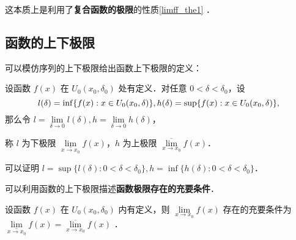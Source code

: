 这本质上是利用了\textbf{复合函数的极限}的性质\autoref{limff_the1} ．

\subsection{函数的上下极限}
可以模仿序列的上下极限给出函数上下极限的定义：

设函数 $f(x)$ 在 $U_0(x_0,\delta_0)$ 处有定义．对任意 $0<\delta<\delta_0$，设
$$
l(\delta)=\inf\{f(x):x\in U_0(x_0,\delta)\},\\
h(\delta)=\sup\{f(x):x\in U_0(x_0,\delta)\},
$$
那么令 $l=\lim\limits_{\delta\rightarrow 0}l(\delta), h=\lim\limits_{\delta\rightarrow 0}h(\delta)$，

称 $l$ 为下极限 $\underline\lim\limits_{x\rightarrow x_0}f(x)$，$h$ 为上极限 $\overline\lim\limits_{x\rightarrow x_0}f(x)$．

可以证明 $l=\sup\{l(\delta):0<\delta<\delta_0\},h=\inf\{h(\delta):0<\delta<\delta_0\}$．

可以利用函数的上下极限描述\textbf{函数极限存在的充要条件}．
\begin{theorem}{}
设函数 $f(x)$ 在 $U_0(x_0,\delta_0)$ 内有定义，则 $\lim\limits_{x\rightarrow x_0}f(x)$ 存在的充要条件为 $\underline \lim\limits_{x\rightarrow x_0}f(x)=\overline\lim\limits_{x\rightarrow x_0}f(x)$ ．
\end{theorem}
